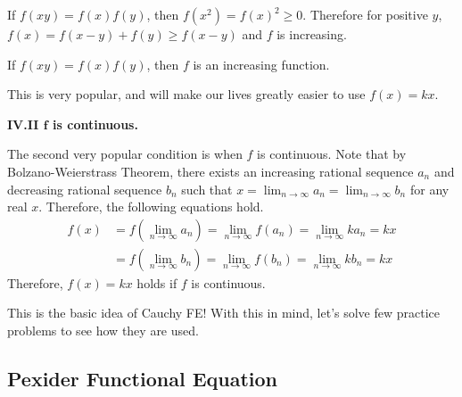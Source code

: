 \documentclass[../../../main.tex]{subfiles}
\begin{document}
If $f(xy) = f(x) f(y)$, then $f(x^2) = f(x)^2 \geq 0$. Therefore
for positive $y$, $f(x) = f(x - y) + f(y) \geq f(x - y)$ and
$f$ is increasing.

\begin{important}
If $f(xy) = f(x) f(y)$, then $f$ is an increasing function.
\end{important}

This is very popular, and will make our lives greatly easier
to use $f(x) = kx$.

{\large\textbf{IV.II $\mathbf{f}$ is continuous.}}

The second very popular condition is when $f$ is continuous.
Note that by Bolzano-Weierstrass Theorem, there exists
an increasing rational sequence $a_n$ and decreasing rational
sequence $b_n$ such that $x = \lim_{n \to \infty} a_n =
\lim_{n \to \infty} b_n$ for any real $x$. Therefore,
the following equations hold.
\begin{align*}
    f(x)
    &= f \left( \lim_{n \to \infty} a_n \right)
    = \lim_{n \to \infty} f(a_n)
    = \lim_{n \to \infty} ka_n
    = kx \\
    &= f \left( \lim_{n \to \infty} b_n \right)
    = \lim_{n \to \infty} f(b_n)
    = \lim_{n \to \infty} kb_n
    = kx
\end{align*}
Therefore, $f(x) = kx$ holds if $f$ is continuous.

This is the basic idea of Cauchy FE! With this in mind,
let's solve few practice problems to see how they are used.





\subsection{Pexider Functional Equation}
\end{document}

